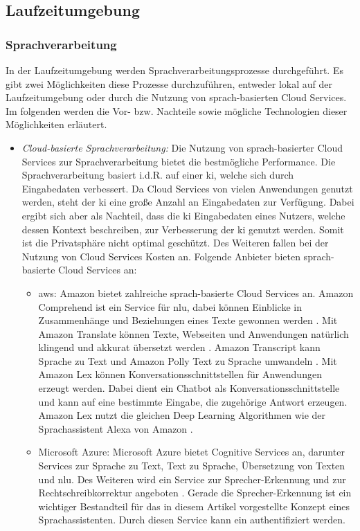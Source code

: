 \subsection{Laufzeitumgebung}
\subsubsection{Sprachverarbeitung}
In der Laufzeitumgebung werden Sprachverarbeitungsprozesse durchgeführt. Es gibt zwei Möglichkeiten diese Prozesse durchzuführen, entweder lokal auf der Laufzeitumgebung oder durch die Nutzung von sprach-basierten Cloud Services. Im folgenden werden die Vor- bzw. Nachteile sowie mögliche Technologien dieser Möglichkeiten erläutert.
\begin{itemize}
	\item \textsl{Cloud-basierte Sprachverarbeitung:} Die Nutzung von sprach-basierter Cloud Services zur Sprachverarbeitung bietet die bestmögliche Performance. Die Sprachverarbeitung basiert i.d.R. auf einer \ac{ki}, welche sich durch Eingabedaten verbessert. Da Cloud Services von vielen Anwendungen genutzt werden, steht der \ac{ki} eine große Anzahl an Eingabedaten zur Verfügung. Dabei ergibt sich aber als Nachteil, dass die \ac{ki} Eingabedaten eines Nutzers, welche dessen Kontext beschreiben, zur Verbesserung der \ac{ki} genutzt werden. Somit ist die Privatsphäre nicht optimal geschützt. Des Weiteren fallen bei der Nutzung von Cloud Services Kosten an. Folgende Anbieter bieten sprach-basierte Cloud Services an:
	\begin{itemize}
		\item \ac{aws}: Amazon bietet zahlreiche sprach-basierte Cloud Services an. Amazon Comprehend ist ein Service für \ac{nlu}, dabei können Einblicke in Zusammenhänge und Beziehungen eines Texte gewonnen werden \cite{AmazonComprehed}. Mit Amazon Translate können Texte, Webseiten und Anwendungen natürlich klingend und akkurat übersetzt werden \cite{AmazonTranslate}. Amazon Transcript kann Sprache zu Text und Amazon Polly Text zu Sprache umwandeln \cite{AmazonTranscript} \cite{AmazonPolly}. Mit Amazon Lex können Konversationsschnittstellen für Anwendungen erzeugt werden. Dabei dient ein Chatbot als Konversationsschnittstelle und kann auf eine bestimmte Eingabe, die zugehörige Antwort erzeugen. Amazon Lex nutzt die gleichen Deep Learning Algorithmen wie der Sprachassistent Alexa von Amazon \cite{AmazonLex}.
		\item Microsoft Azure: Microsoft Azure bietet Cognitive Services an, darunter Services zur Sprache zu Text, Text zu Sprache, Übersetzung von Texten und \ac{nlu}. Des Weiteren wird ein Service zur Sprecher-Erkennung und zur Rechtschreibkorrektur angeboten \cite{MicrosoftAzureCognitiveServices}. Gerade die Sprecher-Erkennung ist ein wichtiger Bestandteil für das in diesem Artikel vorgestellte Konzept eines Sprachassistenten. Durch diesen Service kann ein authentifiziert werden.  

\end{itemize}
\end{itemize}
